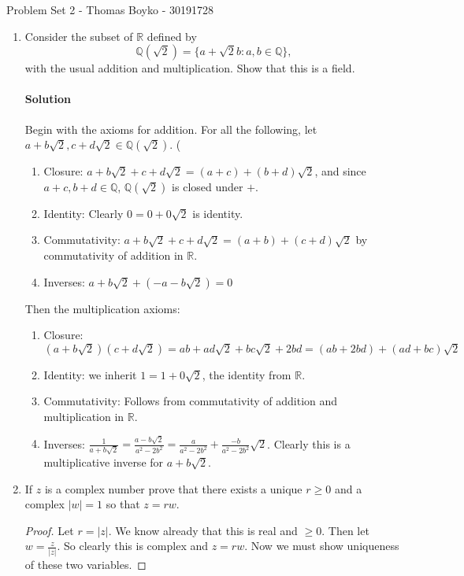 \documentclass{article}
\begin{document}
    \huge Problem Set 2 - Thomas Boyko - 30191728
    \normalsize
\begin{enumerate} 
\item Consider the subset of $\mathbb{R}$ defined by
\[
\mathbb{Q}(\sqrt{2})=\{a+\sqrt{2} b:a,b\in \mathbb{Q}\} 
,\] 
with the usual addition and multiplication. Show that this is a field.
\paragraph{Solution} 

Begin with the axioms for addition. For all the following, let 
$a+b\sqrt{2},c+d\sqrt{2} \in \mathbb{Q}(\sqrt{2} )$.
(
\begin{enumerate}[label= (\roman*)] 
    \item Closure: $a+b\sqrt{2} +c+d\sqrt{2} =(a+c)+(b+d)\sqrt{2}$, and since 
        $a+c, b+d\in \mathbb{Q}$, $\mathbb{Q}(\sqrt{2} )$ is closed under $+$.
    \item Identity: Clearly $0=0+0\sqrt{2} $ is identity.
    \item Commutativity: $a+b\sqrt{2} +c+d\sqrt{2} =(a+b) +(c+d)\sqrt{2}$ by commutativity of 
        addition in $\mathbb{R}$.
    \item Inverses: $a+b\sqrt{2} +(-a-b\sqrt{2} )=0$
\end{enumerate}
Then the multiplication axioms:
\begin{enumerate}[label= (\roman*)] 
    \item Closure: $(a+b\sqrt{2} )(c+d\sqrt{2} )=ab+ad\sqrt{2} +bc\sqrt{2} +2bd=(ab+2bd)+(ad+bc)\sqrt{2} $
    \item Identity: we inherit $1=1+0\sqrt{2} $, the identity from $\mathbb{R}$.
    \item Commutativity: Follows from commutativity of addition and multiplication in $\mathbb{R}$.
    \item Inverses: $\frac{1}{a+b\sqrt{2} }=\frac{a-b\sqrt{2} }{a^2-2b^2}=\frac{a}{a^2-2b^2}+\frac{-b}{a^2-2b^2}\sqrt{2} $.
        Clearly this is a multiplicative inverse for $a+b\sqrt{2} $.
\end{enumerate}

\item If $z$ is a complex number prove that there exists a unique $r\geq 0$ and a complex $|w|=1$ so that
    $z=rw$.

    \begin{proof} 
        Let $r=|z|$. We know already that this is real and $\ge 0$. Then let $w=\frac{z}{|z|}$. So clearly this is complex
        and $z=rw$. Now we must show uniqueness of these two variables.


\end{proof}
\end{enumerate}
\end{document}
